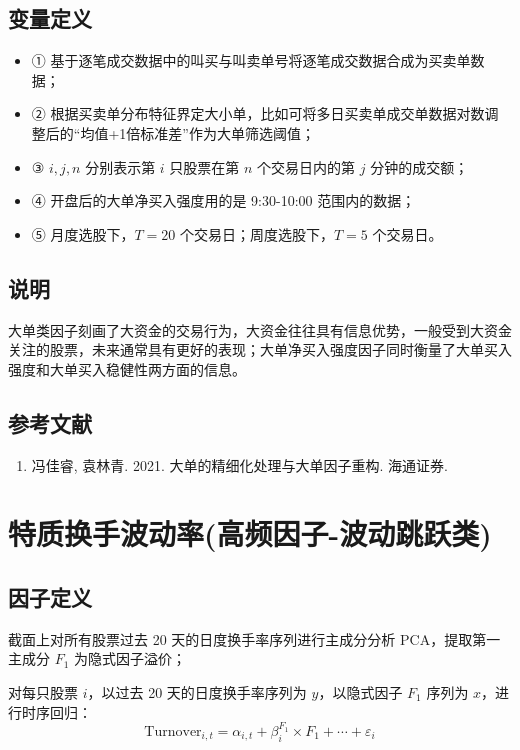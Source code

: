 \documentclass{article}
\begin{document}
\subsection{变量定义}
\begin{itemize}
    \item ① 基于逐笔成交数据中的叫买与叫卖单号将逐笔成交数据合成为买卖单数据；
    \item ② 根据买卖单分布特征界定大小单，比如可将多日买卖单成交单数据对数调整后的“均值+1倍标准差”作为大单筛选阈值；
    \item ③ \( i, j, n \) 分别表示第 \( i \) 只股票在第 \( n \) 个交易日内的第 \( j \) 分钟的成交额；
    \item ④ 开盘后的大单净买入强度用的是 9:30-10:00 范围内的数据；
    \item ⑤ 月度选股下，\( T=20 \) 个交易日；周度选股下，\( T=5 \) 个交易日。
\end{itemize}

\subsection{说明}
大单类因子刻画了大资金的交易行为，大资金往往具有信息优势，一般受到大资金关注的股票，未来通常具有更好的表现；大单净买入强度因子同时衡量了大单买入强度和大单买入稳健性两方面的信息。

\subsection{参考文献}
\begin{enumerate}
    \item 冯佳睿, 袁林青. 2021. 大单的精细化处理与大单因子重构. 海通证券.
\end{enumerate}

\section{特质换手波动率(高频因子-波动跳跃类)}

\subsection{因子定义}

截面上对所有股票过去 20 天的日度换手率序列进行主成分分析 PCA，提取第一主成分 \( F_1 \) 为隐式因子溢价；

对每只股票 \( i \)，以过去 20 天的日度换手率序列为 \( y \)，以隐式因子 \( F_1 \) 序列为 \( x \)，进行时序回归：
\begin{equation}
    \mathrm{Turnover}_{i,t} = \alpha_{i,t} + \beta_i^{F_1} \times F_1 + \cdots + \varepsilon_i
\end{equation}
\end{document}
